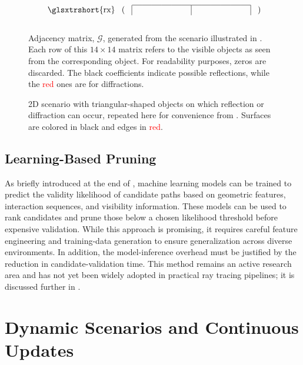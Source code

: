 \begin{figure}
\begin{equation*}
\begin{blockarray}{ccccccccccccccc}
\begin{block}{c(>{\medspace}c|cccccc|cccccc|c<{\medspace})}
        \BAhhline{~~------------~}
        \text{\glsxtrshort{rx}} & {} & {} & {} & {} & {} & {} & {} & {} & {} & {} & {} & {} & {} & {}\\
      \end{block}
    \end{blockarray}
  \end{equation*}
  \caption{Adjacency matrix, $\mathcal{G}$, generated from the scenario illustrated in . Each row of this $14 \times 14$ matrix refers to the visible objects as seen from the corresponding object. For readability purposes, zeros are discarded. The black coefficients indicate possible reflections, while the \textcolor{red}{red} ones are for diffractions.}
\end{figure}

\begin{figure}
  \centering
  \caption{2D scenario with triangular-shaped objects on which reflection or diffraction can occur, repeated here for convenience from . Surfaces are colored in black and edges in \textcolor{red}{red}.}
\end{figure}

\subsection{Learning-Based Pruning}

As briefly introduced at the end of , machine learning models can be trained to predict the validity likelihood of candidate paths based on geometric features, interaction sequences, and visibility information. These models can be used to rank candidates and prune those below a chosen likelihood threshold before expensive validation. While this approach is promising, it requires careful feature engineering and training-data generation to ensure generalization across diverse environments. In addition, the model-inference overhead must be justified by the reduction in candidate-validation time. This method remains an active research area and has not yet been widely adopted in practical ray tracing pipelines; it is discussed further in .

\section{Dynamic Scenarios and Continuous Updates}

